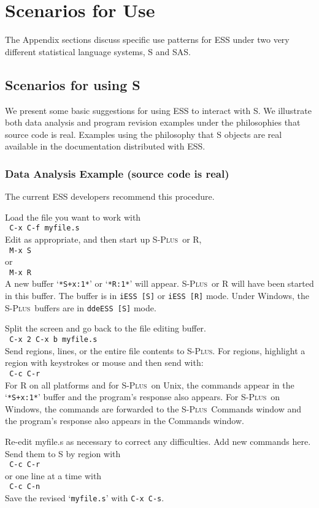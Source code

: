 \documentclass{article}
\newcommand*{\Splus}{\textsc{S-Plus}}
\newcommand{\stexttt}[1]{{\small\texttt{#1}}}
\newcommand{\elcode}[1]{\\{\stexttt{\hspace*{2em} #1}}\\}
\newcommand{\file}[1]{`\stexttt{#1}'}
\begin{document}


\appendix


\section{Scenarios for Use}
\label{app:scenarios}

The Appendix sections discuss specific use patterns for ESS under two very
different statistical language systems, S and SAS.

\subsection{Scenarios for using S}
\label{sec:S:scenarios}

We present some basic suggestions for using ESS to interact with S.
We illustrate both data analysis and program revision examples under
the philosophies that source code is real.
Examples using the philosophy that S objects are real available in the documentation
distributed with ESS.

\subsubsection{Data Analysis Example (source code is real)}
The current ESS developers recommend this procedure.

\noindent
Load the file you want to work with
  \elcode{C-x C-f myfile.s}
Edit as appropriate, and then start up \Splus\ or R,
  \elcode{M-x S}
or 
  \elcode{M-x R}
A new buffer \file{*S+x:1*} or \file{*R:1*} will appear.
\Splus\ or R will have been started
in this buffer.  The buffer is in \stexttt{iESS [S]} or \stexttt{iESS [R]} mode.
Under Windows, the \Splus\ buffers are in  \stexttt{ddeESS [S]} mode.

Split the screen and go back to the file editing buffer.
  \elcode{C-x 2 C-x b myfile.s}
Send regions, lines, or the entire file contents to \Splus.
For regions, highlight a region with keystrokes or mouse
and then send with:
  \elcode{C-c C-r}
For R on all platforms and for \Splus\ on Unix, the commands appear in
the \file{*S+x:1*} buffer and the program's response also appears.
For \Splus\ on Windows, the commands are forwarded to the \Splus\ Commands
window and the program's response also appears in the Commands window.

Re-edit myfile.s as necessary to correct any difficulties.  Add
new commands here.  Send them to S by region with
  \elcode{C-c C-r}
or one line at a time with
  \elcode{C-c C-n}
Save the revised \file{myfile.s} with \stexttt{C-x C-s}.
\end{document}
